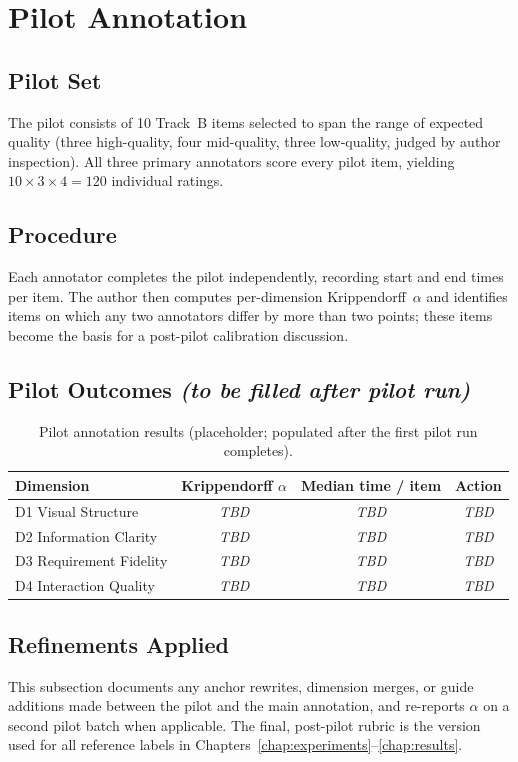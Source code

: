 \section{Pilot Annotation}
\label{sec:pilot}

\subsection{Pilot Set}

The pilot consists of 10 Track~B items selected to span the range of
expected quality (three high-quality, four mid-quality, three
low-quality, judged by author inspection). All three primary
annotators score every pilot item, yielding $10 \times 3 \times 4 = 120$
individual ratings.

\subsection{Procedure}

Each annotator completes the pilot independently, recording start and
end times per item. The author then computes per-dimension
Krippendorff~$\alpha$ and identifies items on which any two annotators
differ by more than two points; these items become the basis for a
post-pilot calibration discussion.

\subsection{Pilot Outcomes \textit{(to be filled after pilot run)}}

\begin{table}[ht]
\centering
\small
\begin{tabular}{@{}lccc@{}}
\toprule
\textbf{Dimension} & \textbf{Krippendorff $\alpha$} & \textbf{Median time / item} & \textbf{Action} \\
\midrule
D1 Visual Structure       & \textit{TBD} & \textit{TBD} & \textit{TBD} \\
D2 Information Clarity    & \textit{TBD} & \textit{TBD} & \textit{TBD} \\
D3 Requirement Fidelity   & \textit{TBD} & \textit{TBD} & \textit{TBD} \\
D4 Interaction Quality    & \textit{TBD} & \textit{TBD} & \textit{TBD} \\
\bottomrule
\end{tabular}
\caption{Pilot annotation results (placeholder; populated after the
first pilot run completes).}
\label{tab:pilot-irr}
\end{table}

\subsection{Refinements Applied}

This subsection documents any anchor rewrites, dimension merges, or
guide additions made between the pilot and the main annotation, and
re-reports $\alpha$ on a second pilot batch when applicable. The
final, post-pilot rubric is the version used for all reference labels
in Chapters~\ref{chap:experiments}--\ref{chap:results}.
